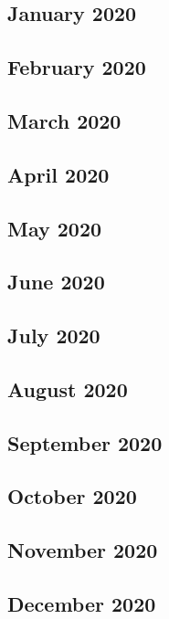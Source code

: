 \documentclass{article}
\begin{document}
	\subsection{January 2020}
	
	\subsection{February 2020}
	
	\subsection{March 2020}
	
	\subsection{April 2020}	
	
	\subsection{May 2020}
	
	\subsection{June 2020}
	
	\subsection{July 2020}
	
	\subsection{August 2020}
	
	\subsection{September 2020}
	
	\subsection{October 2020}
	
	\subsection{November 2020}
	
	\subsection{December 2020}
	
\end{document}
